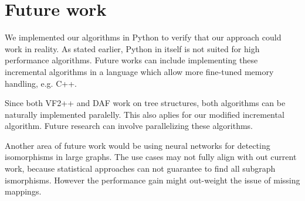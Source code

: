 \chapter{Future work}

We implemented our algorithms in Python to verify that our approach could work in reality. As stated earlier,
Python in itself is not suited for high performance algorithms. Future works can include implementing these
incremental algorithms in a language which allow more fine-tuned memory handling, e.g. C++.

Since both VF2++ and DAF work on tree structures, both algorithms can be naturally implemented paralelly. This
also aplies for our modified incremental algorithm. Future research can involve parallelizing these algorithms.

Another area of future work would be using neural networks for detecting isomorphisms in large graphs. The use 
cases may not fully align with out current work, because statistical approaches can not guarantee to find all
subgraph ismorphisms. However the performance gain might out-weight the issue of missing mappings.